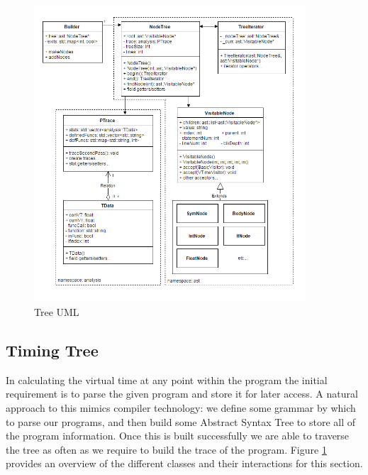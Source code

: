 \documentclass[11pt, abstracton, twoside]{scrartcl}
\begin{document}
\begin{figure}[h!]
	\centering
	\includegraphics[width=0.9\textwidth]{images/timing.jpg}
	\caption{Tree UML} \label{tree}
\end{figure}
\newpage

\subsection{Timing Tree}
In calculating the virtual time at any point within the program the initial 
requirement is to parse the given program and store it for later access. A 
natural approach to this mimics compiler technology: we define some
grammar by which to parse our programs, and then build some Abstract Syntax Tree 
to store all of the program information. Once this 
is built successfully we are able to traverse the tree as often as we require 
to build the trace of the program. Figure \ref{tree} provides an overview of the 
different classes and their interactions for this section.
\end{document}
